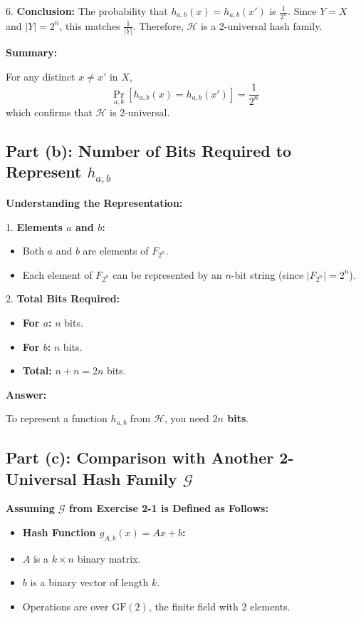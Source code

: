 \documentclass[12pt,letterpaper]{article}
\begin{document}
6. \textbf{Conclusion:}
   The probability that \( h_{a,b}(x) = h_{a,b}(x') \) is \( \frac{1}{2^n} \).
   Since \( Y = X \) and \( |Y| = 2^n \), this matches \( \frac{1}{|Y|} \).
   Therefore, \( \mathcal{H} \) is a 2-universal hash family.

\textbf{Summary:}

For any distinct \( x \neq x' \) in \( X \),
\[
\Pr_{a, b}[h_{a,b}(x) = h_{a,b}(x')] = \frac{1}{2^n}
\]
which confirms that \( \mathcal{H} \) is 2-universal.

\subsection*{Part (b): Number of Bits Required to Represent \( h_{a,b} \)}

\textbf{Understanding the Representation:}

1. \textbf{Elements \( a \) and \( b \):}
   \begin{itemize}
       \item Both \( a \) and \( b \) are elements of \( F_{2^n} \).
       \item Each element of \( F_{2^n} \) can be represented by an \( n \)-bit string (since \( |F_{2^n}| = 2^n \)).
   \end{itemize}

2. \textbf{Total Bits Required:}
   \begin{itemize}
       \item \textbf{For \( a \):} \( n \) bits.
       \item \textbf{For \( b \):} \( n \) bits.
       \item \textbf{Total:} \( n + n = 2n \) bits.
   \end{itemize}

\textbf{Answer:}

To represent a function \( h_{a,b} \) from \( \mathcal{H} \), you need \textbf{\( 2n \) bits}.

\subsection*{Part (c): Comparison with Another 2-Universal Hash Family \( \mathcal{G} \)}

\textbf{Assuming \( \mathcal{G} \) from Exercise 2-1 is Defined as Follows:}

\begin{itemize}
    \item \textbf{Hash Function \( g_{A,b}(x) = A x + b \):}
    \item \( A \) is a \( k \times n \) binary matrix.
    \item \( b \) is a binary vector of length \( k \).
    \item Operations are over \( \text{GF}(2) \), the finite field with 2 elements.
\end{itemize}
\end{document}
